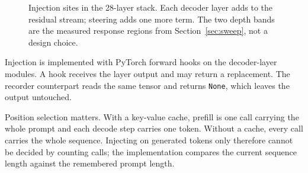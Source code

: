 \documentclass[twocolumn,10pt,a4paper]{article}
\newcommand{\code}[1]{\texttt{\small #1}}
\begin{document}
\begin{figure}[t]
\centering
{}
\caption{Injection sites in the 28-layer stack. Each decoder layer adds to the
residual stream; steering adds one more term. The two depth bands are the
measured response regions from Section~\ref{sec:sweep}, not a design choice.}
\label{fig:stack}
\end{figure}

Injection is implemented with PyTorch forward hooks on the decoder-layer
modules. A hook receives the layer output and may return a replacement. The
recorder counterpart reads the same tensor and returns \code{None}, which leaves
the output untouched.

Position selection matters. With a key-value cache, prefill is one call carrying
the whole prompt and each decode step carries one token. Without a cache, every
call carries the whole sequence. Injecting on generated tokens only therefore
cannot be decided by counting calls; the implementation compares the current
sequence length against the remembered prompt length.
\end{document}
